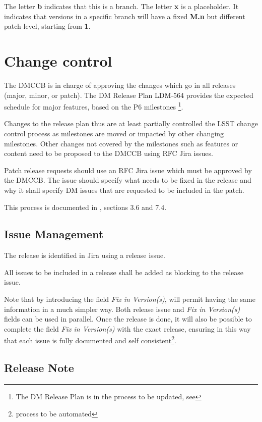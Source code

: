 The letter  \textbf{b} indicates that this is a branch.
The letter \textbf{x} is a placeholder. It indicates that versions in a specific branch will have a fixed \textbf{M.n} but different patch level, starting from \textbf{1}.


\newpage
\section{Change control} \label{sec:changecontrol}

The DMCCB is in charge of approving the changes which go in all releases (major, minor, or patch).
The DM Release Plan LDM-564 provides the expected schedule for major features, based on the P6 milestones \footnote{The DM Release Plan is in the process to be updated, see }.

Changes to the release plan thus are at least partially controlled the LSST change control process as milestones are moved or impacted by other changing milestones. Other changes not covered by the milestones such as features or content need to be proposed to the DMCCB using RFC Jira issues.

Patch release requests should use an RFC Jira issue which must be approved by the DMCCB.
The issue should specify what needs to be fixed in the release and why it shall specify DM issues that are requested to be included in the patch.

This process is documented in , sections 3.6 and 7.4.


\subsection{Issue Management} \label{sec:issues}

The release is identified in Jira using a release issue.

All issues to be included in a release shall be added as blocking to the release issue.

Note that by introducing the field \textit{Fix in Version(s)}, will permit having the same information in a much simpler way.
Both release issue and \textit{Fix in Version(s)} fields can be used in parallel.
Once the release is done, it will also be possible to complete the field \textit{Fix in Version(s)} with the exact release,
ensuring in this way that each issue is fully documented and self consistent\footnote{process to be automated}.


\subsection{Release Note} \label{sec:relnote}

